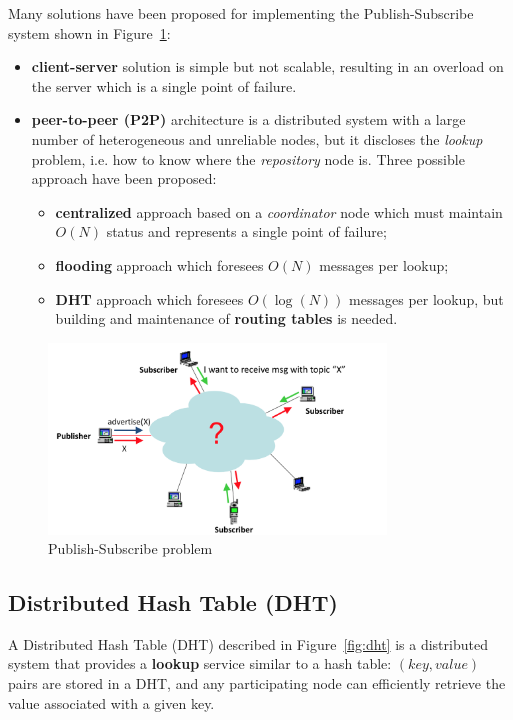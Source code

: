 \documentclass[a4paper,12pt]{article}
\begin{document}
Many solutions have been proposed for implementing the Publish-Subscribe system shown in Figure~\ref{fig:ps-problem}:
\begin{itemize}
  \item \textbf{client-server} solution is simple but not scalable, resulting in an overload on the server which is a single point of failure.
  \item \textbf{peer-to-peer (P2P)} architecture is a distributed system with a large number of heterogeneous and unreliable nodes, but it discloses the \textit{lookup} problem, i.e. how to know where the \textit{repository} node is. Three possible approach have been proposed:
  \begin{itemize}
    \item \textbf{centralized} approach based on a \textit{coordinator} node which must maintain $O(N)$ status and represents a single point of failure;
    \item \textbf{flooding} approach which foresees $O(N)$ messages per lookup;
    \item \textbf{DHT} approach which foresees $O(\log(N))$ messages per lookup, but building and maintenance of \textbf{routing tables} is needed.
  \end{itemize}
\end{itemize}

\begin{figure}[b!]
  \centering
  \includegraphics[width=0.8\textwidth]{img/ps-problem}
  \caption{\label{fig:ps-problem} Publish-Subscribe problem}
\end{figure}


\subsection{Distributed Hash Table (DHT)}
A Distributed Hash Table (DHT) described in Figure~\ref{fig:dht} is a distributed system that provides a \textbf{lookup} service similar to a hash table: $(key, value)$ pairs are stored in a DHT, and any participating node can efficiently retrieve the value associated with a given key. 
\end{document}
